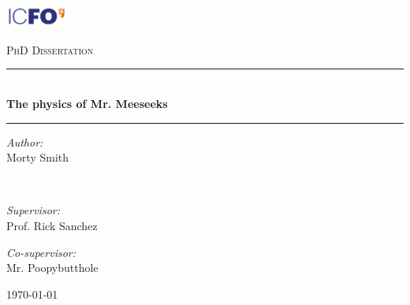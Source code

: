 \begin{titlingpage}
	\centering
	\includegraphics[width=0.15\textwidth]{../2_figures/0_titlepage/icfo.pdf}\par
	
	\vspace{0.05\textheight}
	
	{\scshape\Large PhD Dissertation\par}
	
	\vspace{0.05\textheight}
	
	\rule{\linewidth}{1pt}\\[0.02\textheight]
	\huge{\textbf{The physics of Mr. Meeseeks}}
	\rule{\linewidth}{1pt}
	
	\vspace{0.2\textheight}
	
	\normalsize
	\begin{minipage}{0.4\textwidth}
	\begin{flushleft} 
	\emph{Author:}\\
	Morty Smith %
	\end{flushleft}
	\end{minipage}
	~
	\begin{minipage}{0.4\textwidth}
	\begin{flushright} 
	\emph{Supervisor:} \\
	Prof. Rick Sanchez \\%
	
	\vspace{0.05\textheight}
	
	\emph{Co-supervisor:} \\
	Mr. Poopybutthole %
	\end{flushright}
	\end{minipage}
	
	\vspace{0.3\textheight}
	
	\small
	\today
	\normalsize
\end{titlingpage}